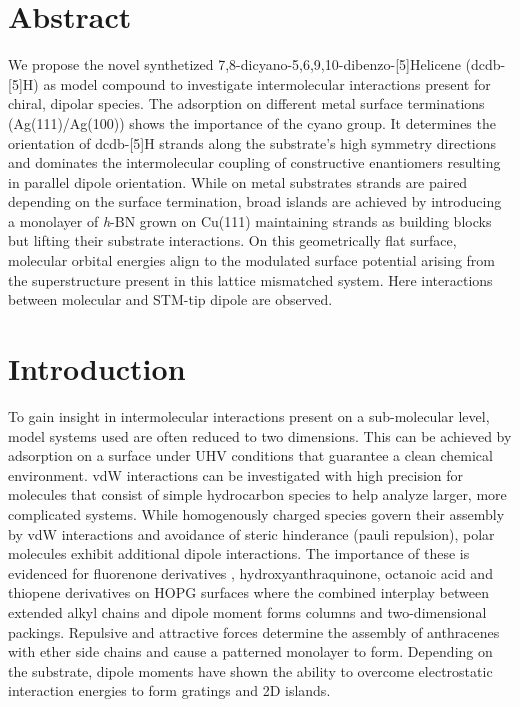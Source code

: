 \label{section:helicene}
\section{Abstract}

We propose the novel synthetized 7,8-dicyano-5,6,9,10-dibenzo-[5]Helicene (dcdb-[5]H) as model compound to investigate intermolecular interactions present for chiral, dipolar species. The adsorption on different metal surface terminations (Ag(111)/Ag(100)) shows the importance of the cyano group. It determines the orientation of dcdb-[5]H strands along the substrate's high symmetry directions and dominates the intermolecular coupling of constructive enantiomers resulting in parallel dipole orientation. While on metal substrates strands are paired depending on the surface termination, broad islands are achieved by introducing a monolayer of \textit{h}-BN grown on Cu(111) maintaining strands as building blocks but lifting their substrate interactions. On this geometrically flat surface, molecular orbital energies align to the modulated surface potential arising from the superstructure present in this lattice mismatched system. Here interactions between molecular and STM-tip dipole are observed.

\section{Introduction}

To gain insight in intermolecular interactions present on a sub-molecular level, model systems used are often reduced to two dimensions. This can be achieved by adsorption on a surface under UHV conditions that guarantee a clean chemical environment. vdW interactions can be investigated with high precision for molecules that consist of simple hydrocarbon species to help analyze larger, more complicated systems. 
While homogenously charged species govern their assembly by vdW interactions and avoidance of steric hinderance (pauli repulsion), polar molecules exhibit additional dipole interactions. The importance of these is evidenced for fluorenone derivatives \cite{Cui_Self-assembly_2015, Xu_Dipole-controlled_2013, Xu_Two-dimensional_2012}, hydroxyanthraquinone\cite{Hu_Structural_2016}, octanoic acid \cite{Hu_Effects_2017} and thiopene derivatives \cite{Heller_Self-assemlby_2012} on HOPG surfaces where the combined interplay between extended alkyl chains and dipole moment forms columns and two-dimensional packings. Repulsive and attractive forces determine the assembly of anthracenes with ether side chains and cause a patterned monolayer to form\cite{Wei_Dipolar-control_2006}.  Depending on the substrate, dipole moments have shown the ability to overcome electrostatic interaction energies to form gratings and 2D islands.\cite{Kunkel_Self-assembly_2015}

